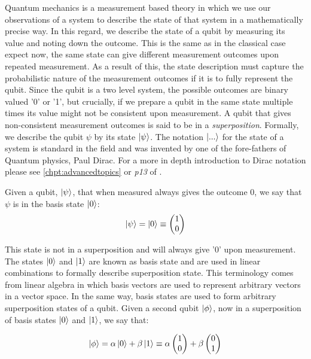 Quantum mechanics is a measurement based theory in which we use our observations of a system to describe the state of that system in a mathematically precise way. In this regard, we describe the state of a qubit by measuring its value and noting down the outcome. This is the same as in the classical case expect now, the same state can give different measurement outcomes upon repeated measurement. As a result of this, the state description must capture the probabilistic nature of the measurement outcomes if it is to fully represent the qubit. Since the qubit is a two level system, the possible outcomes are binary valued '0' or '1', but crucially, if we prepare a qubit in the same state multiple times its value might not be consistent upon measurement. A qubit that gives non-consistent measurement outcomes is said to be in a \textit{superposition}.  Formally, we describe the qubit $\psi$ by its state $\left\vert{\psi}\right\rangle$. The notation $\left\vert{...}\right\rangle$ for the state of a system is standard in the field and was invented by one of the fore-fathers of Quantum physics, Paul Dirac. For a more in depth introduction to Dirac notation please see \autoref{chpt:advancedtopics} or \textit{p13} of \cite{nielsen_chuang_2010}.

Given a qubit, $\left\vert{\psi}\right\rangle$, that when measured always gives the outcome 0, we say that $\psi$ is in the basis state $\left\vert{0}\right\rangle$:\\

\begin{equation}
    \left\vert{\psi}\right\rangle=\left\vert{0}\right\rangle\equiv\begin{pmatrix}  1\\ 0 \end{pmatrix}
\end{equation}

This state is not in a superposition and will always give '0' upon measurement. The states $\left\vert{0}\right\rangle$ and $\left\vert{1}\right\rangle$ are known as basis state and are used in linear combinations to formally describe superposition state. This terminology comes from linear algebra in which basis vectors are used to represent arbitrary vectors in a vector space. In the same way, basis states are used to form arbitrary superposition states of a qubit. Given a second qubit $\left\vert{\phi}\right\rangle$, now in a superposition of basis states $\left\vert{0}\right\rangle$ and $\left\vert{1}\right\rangle$, we say that:

\begin{equation}\label{qubit}
    \left\vert{\phi}\right\rangle=\alpha\left\vert{0}\right\rangle+\beta\left\vert{1}\right\rangle\equiv\alpha \begin{pmatrix}  1\\ 0 \end{pmatrix} + \beta \begin{pmatrix} 0\\ 1 \end{pmatrix}
\end{equation}

